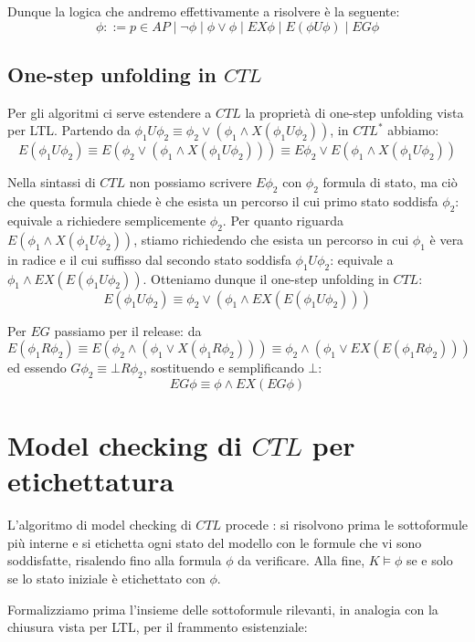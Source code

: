 Dunque la logica che andremo effettivamente a risolvere è la seguente:
\[\phi::= p \in AP \mid \neg \phi \mid \phi \lor \phi \mid EX \phi \mid E(\phi U \phi) \mid EG \phi\]

\subsection{One-step unfolding in \(CTL\)}

Per gli algoritmi ci serve estendere a \(CTL\) la proprietà di one-step unfolding vista per LTL\@. Partendo da \(\phi_1 U \phi_2 \equiv \phi_2 \lor (\phi_1 \land X(\phi_1 U \phi_2))\), in \(CTL^*\) abbiamo:
\[E(\phi_1 U \phi_2 )\equiv E(\phi_2 \lor (\phi_1 \land X(\phi_1 U \phi_2))) \equiv E\phi_2 \lor E(\phi_1 \land X(\phi_1 U \phi_2))\]

Nella sintassi di \(CTL\) non possiamo scrivere \(E \phi_2\) con \(\phi_2\) formula di stato, ma ciò che questa formula chiede è che esista un percorso il cui primo stato soddisfa \(\phi_2\): equivale a richiedere semplicemente \(\phi_2\). Per quanto riguarda \(E(\phi_1 \land X(\phi_1 U \phi_2))\), stiamo richiedendo che esista un percorso in cui \(\phi_1\) è vera in radice e il cui suffisso dal secondo stato soddisfa \(\phi_1 U \phi_2\): equivale a \(\phi_1 \land EX (E (\phi_1 U \phi_2))\). Otteniamo dunque il one-step unfolding in \(CTL\):
\[E(\phi_1 U \phi_2) \equiv \phi_2 \lor (\phi_1 \land EX (E (\phi_1 U \phi_2)))\]

Per \(EG\) passiamo per il release: da
\[E(\phi_1 R \phi_2) \equiv E(\phi_2 \land (\phi_1 \lor X(\phi_1 R \phi_2))) \equiv \phi_2 \land (\phi_1 \lor EX (E (\phi_1 R \phi_2)))\]
ed essendo \(G \phi_2 \equiv \bot R \phi_2\), sostituendo e semplificando \(\bot\):
\[EG \phi \equiv \phi \land EX (EG \phi)\]

\section{Model checking di \(CTL\) per etichettatura}

L'algoritmo di model checking di \(CTL\) procede : si risolvono prima le sottoformule più interne e si etichetta ogni stato del modello con le formule che vi sono soddisfatte, risalendo fino alla formula \(\phi\) da verificare. Alla fine, \(K \models \phi\) se e solo se lo stato iniziale è etichettato con \(\phi\).

Formalizziamo prima l'insieme delle sottoformule rilevanti, in analogia con la chiusura vista per LTL, per il frammento esistenziale:

